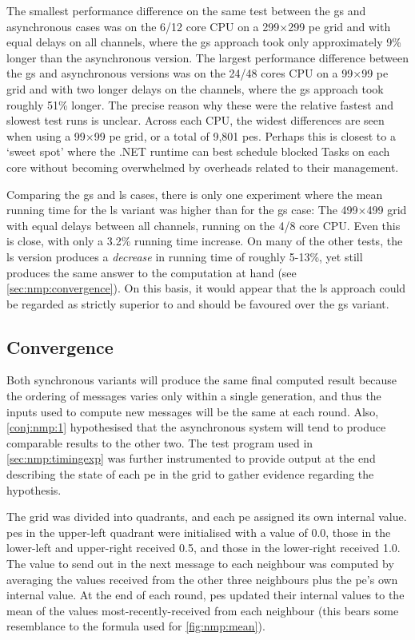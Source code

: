 The smallest performance difference on the same test between the \gls{gs} and asynchronous cases was on the 6/12 core CPU on a 299×299 \gls{pe} grid and with equal delays on all channels, where the \gls{gs} approach took only approximately 9\% longer than the asynchronous version.  The largest performance difference between the \gls{gs} and asynchronous versions was on the 24/48 cores CPU on a 99×99 \gls{pe} grid and with two longer delays on the channels, where the \gls{gs} approach took roughly 51\% longer.  The precise reason why these were the relative fastest and slowest test runs is unclear.  Across each CPU, the widest differences are seen when using a 99×99 \gls{pe} grid, or a total of 9,801 \glspl{pe}.  Perhaps this is closest to a `sweet spot' where the .NET runtime can best schedule blocked Tasks on each core without becoming overwhelmed by overheads related to their management.

Comparing the \gls{gs} and \gls{ls} cases, there is only one experiment where the mean running time for the \gls{ls} variant was higher than for the \gls{gs} case:  The 499×499 grid with equal delays between all channels, running on the 4/8 core CPU.  Even this is close, with only a 3.2\% running time increase.   On many of the other tests, the \gls{ls} version produces a \emph{decrease} in running time of roughly 5-13\%, yet still produces the same answer to the computation at hand (see \cref{sec:nmp:convergence}).  On this basis, it would appear that the \gls{ls} approach could be regarded as strictly superior to and should be favoured over the \gls{gs} variant.

\subsection{\label{sec:nmp:convergence}Convergence}
Both synchronous variants will produce the same final computed result because the ordering of messages varies only within a single generation, and thus the inputs used to compute new messages will be the same at each round.  Also, \cref{conj:nmp:1} hypothesised that the asynchronous system will tend to produce comparable results to the other two.  The test program used in \cref{sec:nmp:timingexp} was further instrumented to provide output at the end describing the state of each \gls{pe} in the grid to gather evidence regarding the hypothesis.

The grid was divided into quadrants, and each \gls{pe} assigned its own internal value.  \Glspl{pe} in the upper-left quadrant were initialised with a value of 0.0, those in the lower-left and upper-right received 0.5, and those in the lower-right received 1.0.  The value to send out in the next message to each neighbour was computed by averaging the values received from the other three neighbours plus the \gls{pe}'s own internal value.  At the end of each round, \glspl{pe} updated their internal values to the mean of the values most-recently-received from each neighbour (this bears some resemblance to the formula used for \cref{fig:nmp:mean}).  %

